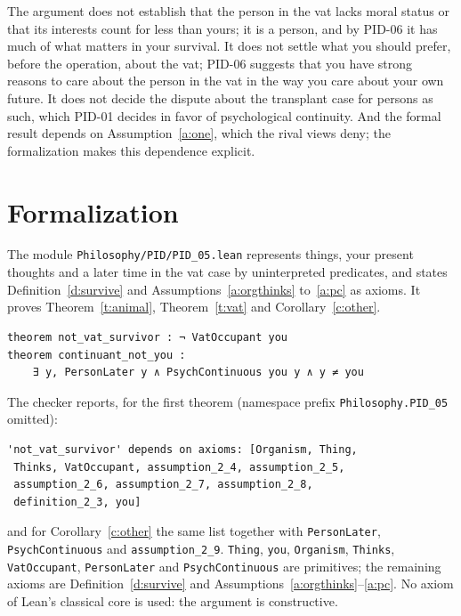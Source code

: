 \documentclass{situationist-preprint}
\begin{document}
The argument does not establish that the person in the vat lacks moral status or that its interests count for less than yours; it is a person, and by PID-06 it has much of what matters in your survival. It does not settle what you should prefer, before the operation, about the vat; PID-06 suggests that you have strong reasons to care about the person in the vat in the way you care about your own future. It does not decide the dispute about the transplant case for persons as such, which PID-01 decides in favor of psychological continuity. And the formal result depends on Assumption~\ref{a:one}, which the rival views deny; the formalization makes this dependence explicit.

\section{Formalization}\label{s:formal}

The module \nolinkurl{Philosophy/PID/PID_05.lean} represents things, your present thoughts and a later time in the vat case by uninterpreted predicates, and states Definition~\ref{d:survive} and Assumptions~\ref{a:orgthinks} to~\ref{a:pc} as axioms. It proves Theorem~\ref{t:animal}, Theorem~\ref{t:vat} and Corollary~\ref{c:other}.

\begin{lstlisting}
theorem not_vat_survivor : ¬ VatOccupant you
theorem continuant_not_you :
    ∃ y, PersonLater y ∧ PsychContinuous you y ∧ y ≠ you
\end{lstlisting}

The checker reports, for the first theorem (namespace prefix \texttt{Philosophy.PID\_05} omitted):

\begin{lstlisting}
'not_vat_survivor' depends on axioms: [Organism, Thing,
 Thinks, VatOccupant, assumption_2_4, assumption_2_5,
 assumption_2_6, assumption_2_7, assumption_2_8,
 definition_2_3, you]
\end{lstlisting}

\noindent and for Corollary~\ref{c:other} the same list together with \texttt{PersonLater}, \texttt{PsychContinuous} and \texttt{assumption\_2\_9}. \texttt{Thing}, \texttt{you}, \texttt{Organism}, \texttt{Thinks}, \texttt{VatOccupant}, \texttt{PersonLater} and \texttt{PsychContinuous} are primitives; the remaining axioms are Definition~\ref{d:survive} and Assumptions~\ref{a:orgthinks}--\ref{a:pc}. No axiom of Lean's classical core is used: the argument is constructive.
\end{document}
